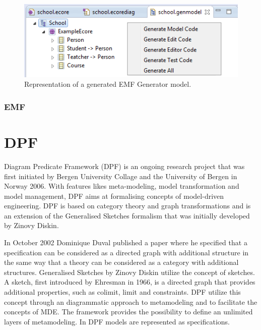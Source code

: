 \begin{figure}[H]
	\centering
	\includegraphics[scale=0.7]{./Figures/EMF_GenModel.png}
	\caption[Representation of an EMF Generator model]
	{Representation of a generated EMF Generator model.}
	\label{fig:EMF_Ecore}
\end{figure}

\subsubsection{EMF}

\section{DPF}

Diagram Predicate Framework\cite{Rutle_thesis,Rossini_thesis,Lamo2013} (DPF) is
an ongoing research project that was first initiated by Bergen University
Collage and the University of Bergen in Norway 2006. With features likes
meta-modeling, model transformation and model management, DPF aims at
formalising concepts of model-driven engineering. DPF is based on category
theory and graph transformations and is an extension of the Generalised
Sketches\cite{Diskin2003} formalism that was initially developed by Zinovy
Diskin.

In October 2002 Dominique Duval published a paper where he specified that a
specification can be considered as a directed graph with additional structure
in the same way that a theory can be considered as a category with additional
structures\cite{Duval2003}. Generalised Sketches by Zinovy Diskin utilize the
concept of sketches. A sketch, first introduced by Ehresman in 1966, is a
directed graph that provides additional properties, such as colimit, limit and
constraints. DPF utilize this concept through an diagrammatic approach to
metamodeling and to facilitate the concepts of MDE. The framework provides the
possibility to define an unlimited layers of metamodeling. In DPF models are
represented as specifications. 

